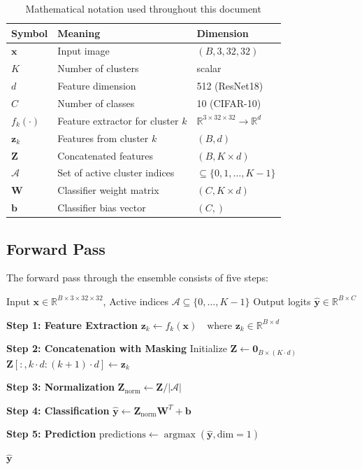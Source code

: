 \documentclass[11pt,a4paper]{article}
\newcommand{\R}{\mathbb{R}}
\newcommand{\argmax}{\operatorname{argmax}}
\begin{document}
\begin{table}[h]
\centering
\begin{tabular}{@{}lll@{}}
\toprule
Symbol & Meaning & Dimension \\ \midrule
$\mathbf{x}$ & Input image & $(B, 3, 32, 32)$ \\
$K$ & Number of clusters & scalar \\
$d$ & Feature dimension & 512 (ResNet18) \\
$C$ & Number of classes & 10 (CIFAR-10) \\
$f_k(\cdot)$ & Feature extractor for cluster $k$ & $\R^{3 \times 32 \times 32} \to \R^d$ \\
$\mathbf{z}_k$ & Features from cluster $k$ & $(B, d)$ \\
$\mathbf{Z}$ & Concatenated features & $(B, K \times d)$ \\
$\mathcal{A}$ & Set of active cluster indices & $\subseteq \{0, 1, \ldots, K-1\}$ \\
$\mathbf{W}$ & Classifier weight matrix & $(C, K \times d)$ \\
$\mathbf{b}$ & Classifier bias vector & $(C,)$ \\
\bottomrule
\end{tabular}
\caption{Mathematical notation used throughout this document}
\end{table}

\subsection{Forward Pass}

The forward pass through the ensemble consists of five steps:

\begin{algorithm}
\caption{Ensemble Forward Pass}
\begin{algorithmic}[1]
\Require Input $\mathbf{x} \in \R^{B \times 3 \times 32 \times 32}$, Active indices $\mathcal{A} \subseteq \{0, \ldots, K-1\}$
\Ensure Output logits $\hat{\mathbf{y}} \in \R^{B \times C}$

\State \textbf{Step 1: Feature Extraction}
    \State $\mathbf{z}_k \gets f_k(\mathbf{x}) \quad \text{where } \mathbf{z}_k \in \R^{B \times d}$
\EndFor

\State \textbf{Step 2: Concatenation with Masking}
\State Initialize $\mathbf{Z} \gets \mathbf{0}_{B \times (K \cdot d)}$
    \State $\mathbf{Z}[:, k \cdot d : (k+1) \cdot d] \gets \mathbf{z}_k$
\EndFor

\State \textbf{Step 3: Normalization}
\State $\mathbf{Z}_{\text{norm}} \gets \mathbf{Z} / |\mathcal{A}|$

\State \textbf{Step 4: Classification}
\State $\hat{\mathbf{y}} \gets \mathbf{Z}_{\text{norm}} \mathbf{W}^T + \mathbf{b}$

\State \textbf{Step 5: Prediction}
\State $\text{predictions} \gets \argmax(\hat{\mathbf{y}}, \text{dim}=1)$

\State \Return $\hat{\mathbf{y}}$
\end{algorithmic}
\end{algorithm}
\end{document}

